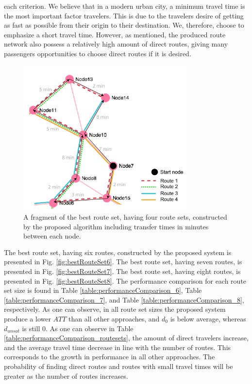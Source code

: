 each criterion. We believe that in a modern urban city, a minimum travel time is the most important factor travelers. This is due to the travelers desire of getting as fast as possible from their origin to their destination. We, therefore, choose to emphasize a short travel time. However, as mentioned, the produced route network also possess a relatively high amount of direct routes, giving many passengers opportunities to choose direct routes if it is desired. 

\begin{figure}[H]
    \begin{center}
    \includegraphics[width=3.5in]{assets/mandl_withTT_utsnitt.png}
    \end{center}
    \caption{A fragment of the best route set, having four route sets, constructed by the proposed algorithm including transfer times in minutes between each node.}
    \label{fig:mandlWithTT} 
\end{figure}

The best route set, having six routes, constructed by the proposed system is presented in Fig. \vref{fig:bestRouteSet6}. The best route set, having seven routes, is presented in Fig. \vref{fig:bestRouteSet7}. The best route set, having eight routes, is presented in Fig. \vref{fig:bestRouteSet8}. The performance comparison for each route set size is found in Table \vref{table:performanceComparison_6}, Table \vref{table:performanceComparison_7}, and Table \vref{table:performanceComparison_8}, respectively. As one can observe, in all route set sizes the proposed system produce a lower $ATT$ than all other approaches, and $d_0$ is below average, whereas $d_{unsat}$ is still 0. As one can observe in Table \vref{table:performanceComparison_routesets}, the amount of direct travelers increase, and the average travel time decrease in line with the number of routes. This corresponds to the growth in performance in all other approaches. The probability of finding direct routes and routes with small travel times will be greater as the number of routes increases. 

